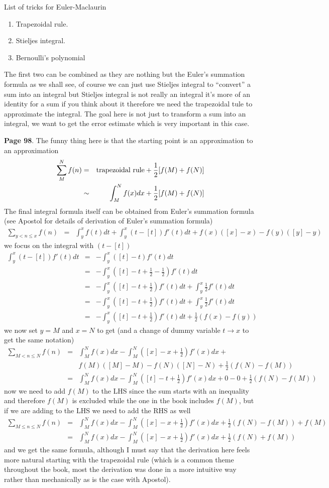 \documentclass[aps,preprint,preprintnumbers,nofootinbib,showpacs,prd]{revtex4-1}
\newcommand{\nbea}{\begin{eqnarray*}}
\newcommand{\neea}{\end{eqnarray*}}
\begin{document}
List of tricks for Euler-Maclaurin
%
\begin{enumerate}
\item Trapezoidal rule.
%
\item Stieljes integral.
%
\item Bernoulli's polynomial
\end{enumerate}
%
The first two can be combined as they are nothing but the Euler's summation formula as we shall see, of course we can just use Stieljes integral to ``convert'' a sum into an integral but Stieljes integral is not really an integral it's more of an identity for a sum if you think about it therefore we need the trapezoidal tule to approximate the integral. The goal here is not just to transform a sum into an integral, we want to get the error estimate which is very important in this case. 


{\bf Page 98}. The funny thing here is that the starting point is an approximation to an approximation
%
\nbea
\sum_{M}^N f(n) & = & {\rm trapezoidal~rule} + \frac{1}{2}[f(M) + f(N)] \\
& \sim & \int_M^N f(x) dx + \frac{1}{2}[f(M) + f(N)]
\neea
%
The final integral formula itself can be obtained from Euler's summation formula (see Apostol for details of derivation of Euler's summation formula)
%
\nbea
\sum_{y < n \le x} f(n) & = & \int_y^x f(t) dt + \int_y^x (t - [t]) f'(t) dt + f(x)([x] - x) - f(y)([y] - y)
\neea
%
we focus on the integral with $(t-[t])$
%
\nbea
\int_y^x (t - [t]) f'(t) dt & = & -\int_y^x ([t] - t) f'(t) dt \\
& = & -\int_y^x ([t] - t + \frac{1}{2} - \frac{1}{2}) f'(t) dt \\
& = & -\int_y^x ([t] - t + \frac{1}{2}) f'(t) dt  + \int_y^x \frac{1}{2} f'(t) dt \\
& = & -\int_y^x ([t] - t + \frac{1}{2}) f'(t) dt  + \int_y^x \frac{1}{2} f'(t) dt \\
& = & -\int_y^x ([t] - t + \frac{1}{2}) f'(t) dt  + \frac{1}{2} (f(x) - f(y))
\neea
%
we now set $y = M$ and $x = N$ to get (and a change of dummy variable $t \to x$ to get the same notation)
%
\nbea
\sum_{M < n \le N} f(n) & = & \int_M^N f(x) dx - \int_M^N ([x] - x + \frac{1}{2}) f'(x) dx + \\
&& f(M)([M] - M) - f(N)([N] - N) + \frac{1}{2} (f(N) - f(M)) \\
& = & \int_M^N f(x) dx - \int_M^N ([t] - t + \frac{1}{2}) f'(x) dx  + 0 - 0 + \frac{1}{2} (f(N) - f(M))
\neea
%
now we need to add $f(M)$ to the LHS since the sum starts with an inequality and therefore $f(M)$ is excluded while the one in the book includes $f(M)$, but if we are adding to the LHS we need to add the RHS as well
%
\nbea
\sum_{M \le n \le N} f(n) & = & \int_M^N f(x) dx - \int_M^N ([x] - x + \frac{1}{2}) f'(x) dx  + \frac{1}{2} (f(N) - f(M)) + f(M) \\
& = & \int_M^N f(x) dx - \int_M^N ([x] - x + \frac{1}{2}) f'(x) dx + \frac{1}{2} (f(N) + f(M))
\neea
%
and we get the same formula, although I must say that the derivation here feels more natural starting with the trapezoidal rule (which is a common theme throughout the book, most the derivation was done in a more intuitive way rather than mechanically as is the case with Apostol).
\end{document}
